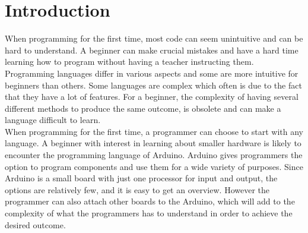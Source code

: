 \section{Introduction}
When programming for the first time, most code can seem unintuitive and can be hard to understand. A beginner can make crucial mistakes and have a hard time learning how to program without having a teacher instructing them.\\

Programming languages differ in various aspects and some are more intuitive for beginners than others. Some languages are complex which often is due to the fact that they have a lot of features. For a beginner, the complexity of having several different methods to produce the same outcome, is obsolete and can make a language difficult to learn. \\

When programming for the first time, a programmer can choose to start with any language. A beginner with interest in learning about smaller hardware is likely to encounter the programming language of Arduino. Arduino gives programmers the option to program components and use them for a wide variety of purposes. Since Arduino is a small board with just one processor for input and output, the options are relatively few, and it is easy to get an overview. However the programmer can also attach other boards to the Arduino, which will add to the complexity of what the programmers has to understand in order to achieve the desired outcome. \\